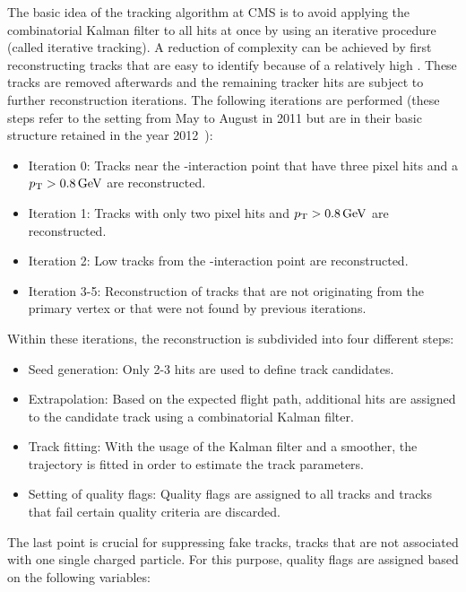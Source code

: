 The basic idea of the tracking algorithm at CMS is to avoid applying the combinatorial Kalman filter to all hits at once by using an iterative procedure (called iterative tracking).
A reduction of complexity can be achieved by first reconstructing tracks that are easy to identify because of \eg a relatively high \pt. 
These tracks are removed afterwards and the remaining tracker hits are subject to further reconstruction iterations.
The following iterations are performed (these steps refer to the setting from May to August in 2011 but are in their basic structure retained in the year 2012~\cite{bib:CMS:tracking_8TeV}):
\begin{itemize}
\item Iteration 0: Tracks near the \pp-interaction point that have three pixel hits and a $p_{\text{T}}>0.8\,\text{Ge}\kern-0.06667em\text{V}$ are reconstructed.
\item Iteration 1: Tracks with only two pixel hits and $p_{\text{T}}>0.8\,\text{Ge}\kern-0.06667em\text{V}$ are reconstructed. 
\item Iteration 2: Low \pt tracks from the \pp-interaction point are reconstructed.
\item Iteration 3-5: Reconstruction of tracks that are not originating from the primary vertex or that were not found by previous iterations.
\end{itemize}
Within these iterations, the reconstruction is subdivided into four different steps:
\begin{itemize}
\item Seed generation: Only 2-3 hits are used to define track candidates.
\item Extrapolation: Based on the expected flight path, additional hits are assigned to the candidate track using a combinatorial Kalman filter.
\item Track fitting: With the usage of the Kalman filter and a smoother, the trajectory is fitted in order to estimate the track parameters.
\item Setting of quality flags: Quality flags are assigned to all tracks and tracks that fail certain quality criteria are discarded.
\end{itemize}
The last point is crucial for suppressing fake tracks, \ie tracks that are not associated with one single charged particle.
For this purpose, quality flags are assigned based on the following variables:
